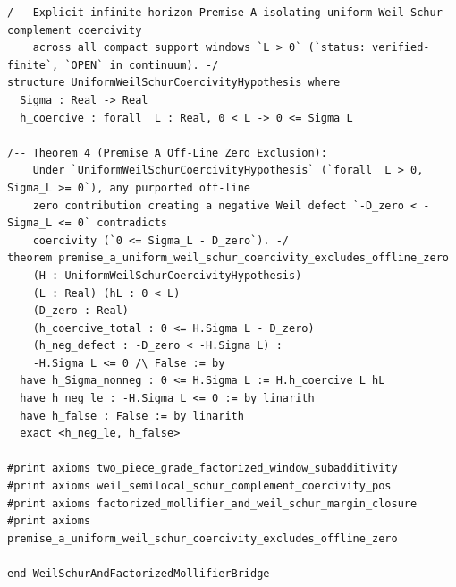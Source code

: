 \documentclass[11pt,a4paper]{article}
\begin{document}
\begin{lstlisting}[language=Lean4]
/-- Explicit infinite-horizon Premise A isolating uniform Weil Schur-complement coercivity
    across all compact support windows `L > 0` (`status: verified-finite`, `OPEN` in continuum). -/
structure UniformWeilSchurCoercivityHypothesis where
  Sigma : Real -> Real
  h_coercive : forall  L : Real, 0 < L -> 0 <= Sigma L

/-- Theorem 4 (Premise A Off-Line Zero Exclusion):
    Under `UniformWeilSchurCoercivityHypothesis` (`forall  L > 0, Sigma_L >= 0`), any purported off-line
    zero contribution creating a negative Weil defect `-D_zero < -Sigma_L <= 0` contradicts
    coercivity (`0 <= Sigma_L - D_zero`). -/
theorem premise_a_uniform_weil_schur_coercivity_excludes_offline_zero
    (H : UniformWeilSchurCoercivityHypothesis)
    (L : Real) (hL : 0 < L)
    (D_zero : Real)
    (h_coercive_total : 0 <= H.Sigma L - D_zero)
    (h_neg_defect : -D_zero < -H.Sigma L) :
    -H.Sigma L <= 0 /\ False := by
  have h_Sigma_nonneg : 0 <= H.Sigma L := H.h_coercive L hL
  have h_neg_le : -H.Sigma L <= 0 := by linarith
  have h_false : False := by linarith
  exact <h_neg_le, h_false>

#print axioms two_piece_grade_factorized_window_subadditivity
#print axioms weil_semilocal_schur_complement_coercivity_pos
#print axioms factorized_mollifier_and_weil_schur_margin_closure
#print axioms premise_a_uniform_weil_schur_coercivity_excludes_offline_zero

end WeilSchurAndFactorizedMollifierBridge

\end{lstlisting}
\end{document}
